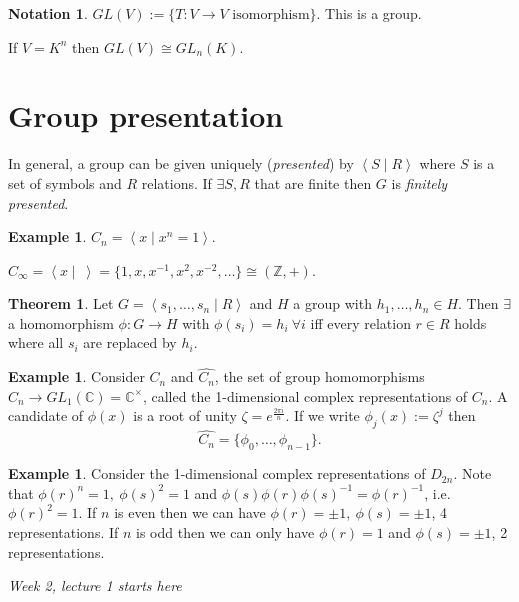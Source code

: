 \documentclass{article}
\newcommand{\la}{\left\langle}
\newcommand{\ra}{\right\rangle}
\newcommand{\Z}{\mathbb{Z}}
\newcommand{\C}{\mathbb{C}}
\theoremstyle{definition}
\newtheorem{thm}[defn]{Theorem}
\newtheorem{example}[defn]{Example}
\newtheorem*{notation}{Notation}
\begin{document}
\begin{notation}
$GL(V):=\{T:V\rightarrow V\text{ isomorphism}\}$. This is a group.

If $V=K^n$ then $GL(V)\cong GL_n(K)$.
\end{notation}

\section{Group presentation}
In general, a group can be given uniquely (\textit{presented}) by $\la S\mid R\ra$ where $S$ is a set of symbols and $R$ relations. If $\exists S,R$ that are finite then $G$ is \textit{finitely presented}.

\begin{example}
$C_n=\la x\mid x^n=1\ra$.

$C_\infty=\la x \mid \ \ra=\{1,x,x^{-1},x^2,x^{-2},\ldots\}\cong (\Z,+)$.
\end{example}

\begin{thm}
\label{thm:homiffrelnholds}
Let $G=\la s_1,\ldots,s_n\mid R\ra$ and $H$ a group with $h_1,\ldots,h_n\in H$. Then $\exists$ a homomorphism $\phi:G\rightarrow H$ with $\phi(s_i)=h_i \ \forall i$ iff every relation $r\in R$ holds where all $s_i$ are replaced by $h_i$.
\end{thm}

\begin{example}
\label{example:Cnrep}
Consider $C_n$ and $\widehat{C_n}$, the set of group homomorphisms $C_n\rightarrow GL_1(\C)=\C^\times$, called the 1-dimensional complex representations of $C_n$. A candidate of $\phi(x)$ is a root of unity $\zeta=e^{\frac{2\pi i}{n}}$. If we write $\phi_j(x):=\zeta^j$ then
\[
\widehat{C_n}=\{\phi_0,\ldots,\phi_{n-1}\}.
\]
\end{example}

\begin{example}
Consider the 1-dimensional complex representations of $D_{2n}$. Note that $\phi(r)^n=1,\ \phi(s)^2=1$ and $\phi(s)\phi(r)\phi(s)^{-1}=\phi(r)^{-1}$, i.e. $\phi(r)^2=1$. If $n$ is even then we can have $\phi(r)=\pm 1,\ \phi(s)=\pm 1$, 4 representations. If $n$ is odd then we can only have $\phi(r)=1$ and $\phi(s)=\pm 1$, 2 representations.
\end{example}

\begin{flushright}
\textit{Week 2, lecture 1 starts here}
\end{flushright}
\end{document}
